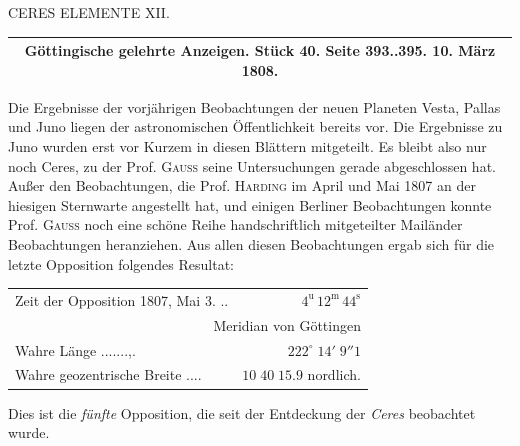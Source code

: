 \clearpage
{}
\hypertarget{native-304-lower}{}
\begin{center}CERES ELEMENTE XII.
\end{center}

\begin{center}
\fontsize{10}{12}\selectfont\begin{tabular}{c}
\hline
Göttingische gelehrte Anzeigen. Stück 40. Seite 393..395. 10. März 1808. \\
\hline
\end{tabular}
\end{center}

Die Ergebnisse der vorjährigen Beobachtungen der neuen Planeten Vesta, Pallas und Juno liegen der astronomischen Öffentlichkeit bereits vor. Die Ergebnisse zu Juno wurden erst vor Kurzem in diesen Blättern mitgeteilt. Es bleibt also nur noch Ceres, zu der Prof. \textsc{Gauss} seine Untersuchungen gerade abgeschlossen hat. Außer den Beobachtungen, die Prof. \textsc{Harding} im April und Mai 1807 an der hiesigen Sternwarte angestellt hat, und einigen Berliner Beobachtungen konnte Prof. \textsc{Gauss} noch eine schöne Reihe handschriftlich mitgeteilter Mailänder Beobachtungen heranziehen. Aus allen diesen Beobachtungen ergab sich für die letzte Opposition folgendes Resultat:


\begin{center}\fontsize{10}{12}\selectfont\setlength{\tabcolsep}{3pt}\renewcommand{\arraystretch}{1.15}\begin{tabular}{lr}
Zeit der Opposition 1807, Mai 3. .\;.\; & $4^{\text{u}}\,12^{\text{m}}\,44^{\text{s}}$\\
\multicolumn{2}{r}{Meridian von Göttingen}\\
Wahre Länge .\;.\;.\;.\;.\;.\;.\;,\;.\; & $222^\circ\;14'\;9''1$\\
Wahre geozentrische Breite .\;.\;.\;.\; & $10\;40\;15.9$ nordlich.\\
\end{tabular}\end{center}

\noindent Dies ist die \emph{fünfte} Opposition, die seit der Entdeckung der \emph{Ceres} beobachtet wurde.

